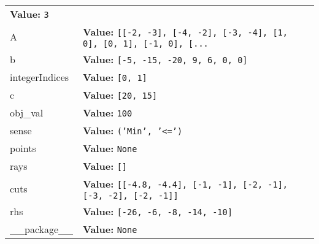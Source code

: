 \begin{longtable}{|p{\varnamewidth}|p{\vardescrwidth}|l}
\textbf{Value:} 
{\tt 3}&\\
\cline{1-2}
\raggedright A\- & \raggedright \textbf{Value:} 
{\tt \texttt{[}\texttt{[}-2\texttt{, }-3\texttt{]}\texttt{, }\texttt{[}-4\texttt{, }-2\texttt{]}\texttt{, }\texttt{[}-3\texttt{, }-4\texttt{]}\texttt{, }\texttt{[}1\texttt{, }0\texttt{]}\texttt{, }\texttt{[}0\texttt{, }1\texttt{]}\texttt{, }\texttt{[}-1\texttt{, }0\texttt{]}\texttt{, }\texttt{[}\texttt{...}}&\\
\cline{1-2}
\raggedright b\- & \raggedright \textbf{Value:} 
{\tt \texttt{[}-5\texttt{, }-15\texttt{, }-20\texttt{, }9\texttt{, }6\texttt{, }0\texttt{, }0\texttt{]}}&\\
\cline{1-2}
\raggedright i\-n\-t\-e\-g\-e\-r\-I\-n\-d\-i\-c\-e\-s\- & \raggedright \textbf{Value:} 
{\tt \texttt{[}0\texttt{, }1\texttt{]}}&\\
\cline{1-2}
\raggedright c\- & \raggedright \textbf{Value:} 
{\tt \texttt{[}20\texttt{, }15\texttt{]}}&\\
\cline{1-2}
\raggedright o\-b\-j\-\_\-v\-a\-l\- & \raggedright \textbf{Value:} 
{\tt 100}&\\
\cline{1-2}
\raggedright s\-e\-n\-s\-e\- & \raggedright \textbf{Value:} 
{\tt \texttt{(}\texttt{'}\texttt{Min}\texttt{'}\texttt{, }\texttt{'}\texttt{{\textless}=}\texttt{'}\texttt{)}}&\\
\cline{1-2}
\raggedright p\-o\-i\-n\-t\-s\- & \raggedright \textbf{Value:} 
{\tt None}&\\
\cline{1-2}
\raggedright r\-a\-y\-s\- & \raggedright \textbf{Value:} 
{\tt \texttt{[}\texttt{]}}&\\
\cline{1-2}
\raggedright c\-u\-t\-s\- & \raggedright \textbf{Value:} 
{\tt \texttt{[}\texttt{[}-4.8\texttt{, }-4.4\texttt{]}\texttt{, }\texttt{[}-1\texttt{, }-1\texttt{]}\texttt{, }\texttt{[}-2\texttt{, }-1\texttt{]}\texttt{, }\texttt{[}-3\texttt{, }-2\texttt{]}\texttt{, }\texttt{[}-2\texttt{, }-1\texttt{]}\texttt{]}}&\\
\cline{1-2}
\raggedright r\-h\-s\- & \raggedright \textbf{Value:} 
{\tt \texttt{[}-26\texttt{, }-6\texttt{, }-8\texttt{, }-14\texttt{, }-10\texttt{]}}&\\
\cline{1-2}
\raggedright \_\-\_\-p\-a\-c\-k\-a\-g\-e\-\_\-\_\- & \raggedright \textbf{Value:} 
{\tt None}&\\
\cline{1-2}
\end{longtable}

